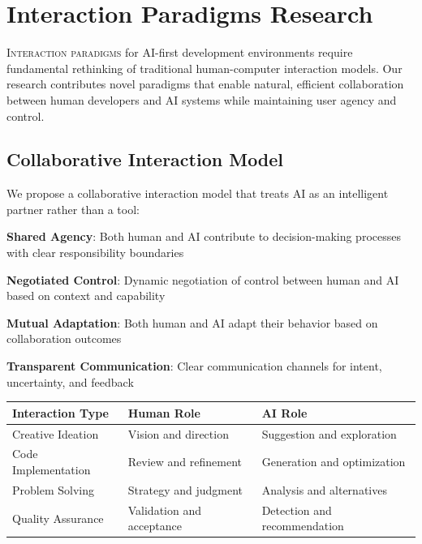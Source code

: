 
\section*{Interaction Paradigms Research}

\lettrine{I}{nteraction paradigms} for AI-first development environments require fundamental rethinking of traditional human-computer interaction models. Our research contributes novel paradigms that enable natural, efficient collaboration between human developers and AI systems while maintaining user agency and control.

\subsection*{Collaborative Interaction Model}

We propose a collaborative interaction model that treats AI as an intelligent partner rather than a tool:

\begin{compactlist}
    \item \textbf{Shared Agency}: Both human and AI contribute to decision-making processes with clear responsibility boundaries
    \item \textbf{Negotiated Control}: Dynamic negotiation of control between human and AI based on context and capability
    \item \textbf{Mutual Adaptation}: Both human and AI adapt their behavior based on collaboration outcomes
    \item \textbf{Transparent Communication}: Clear communication channels for intent, uncertainty, and feedback
\end{compactlist}

\begin{center}
\begin{tabular}{@{}lll@{}}
\toprule
\textbf{Interaction Type} & \textbf{Human Role} & \textbf{AI Role} \\
\midrule
Creative Ideation & Vision and direction & Suggestion and exploration \\
Code Implementation & Review and refinement & Generation and optimization \\
Problem Solving & Strategy and judgment & Analysis and alternatives \\
Quality Assurance & Validation and acceptance & Detection and recommendation \\
\bottomrule
\end{tabular}
\end{center}

